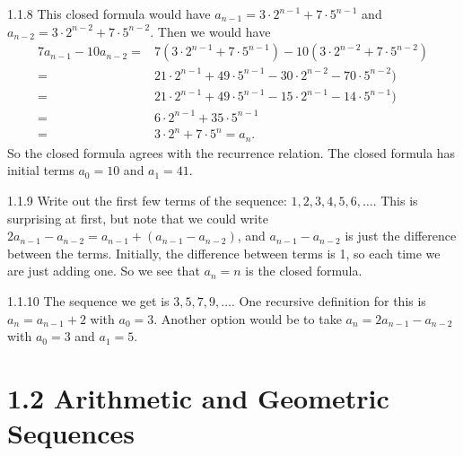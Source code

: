 \documentclass[11pt,]{book}
\theoremstyle{ptxplainnotitle}
\theoremstyle{ptxplaintitle}
\theoremstyle{ptxdefinitionnotitle}
\theoremstyle{ptxdefinitiontitle}
\theoremstyle{ptxdefinitionnotitle}
\theoremstyle{ptxdefinitiontitle}
\theoremstyle{ptxdefinitionnotitle}
\theoremstyle{ptxdefinitiontitle}
\theoremstyle{ptxdefinitiontitlenonumber}
\theoremstyle{ptxdefinitiontitlenonumber}
\numberwithin{equation}{chapter}
\newcommand{\amp}{&}
\begin{document}
\begin{divisionexercise}{1.1.8}
\textbf{}\hypertarget{p-141}{}%
This closed formula would have \(a_{n-1} = 3\cdot 2^{n-1} + 7 \cdot 5^{n-1}\) and \(a_{n-2} = 3\cdot 2^{n-2} + 7 \cdot 5^{n-2}\).  Then we would have%
\begin{align*}
7a_{n-1} - 10a_{n-2} = \amp 7(3\cdot 2^{n-1} + 7 \cdot 5^{n-1}) - 10(3\cdot 2^{n-2} + 7 \cdot 5^{n-2})\\
= \amp 21\cdot 2^{n-1} + 49 \cdot 5^{n-1} - 30\cdot 2^{n-2} - 70 \cdot 5^{n-2}) \\
= \amp 21\cdot 2^{n-1} + 49 \cdot 5^{n-1} - 15\cdot 2^{n-1} - 14 \cdot 5^{n-1}) \\
= \amp 6\cdot 2^{n-1} + 35 \cdot 5^{n-1} \\
= \amp 3\cdot 2^{n} + 7 \cdot 5^{n} = a_n. 
\end{align*}
So the closed formula agrees with the recurrence relation.  The closed formula has initial terms \(a_0 = 10\) and \(a_1 = 41\).%
\end{divisionexercise}%
\begin{divisionexercise}{1.1.9}
\textbf{}\hypertarget{p-143}{}%
Write out the first few terms of the sequence: \(1, 2, 3, 4, 5, 6,\ldots\). This is surprising at first, but note that we could write \(2a_{n-1} - a_{n-2} = a_{n-1} + (a_{n-1} -a_{n-2})\), and \(a_{n-1} - a_{n-2}\) is just the difference between the terms. Initially, the difference between terms is 1, so each time we are just adding one. So we see that \(a_n = n\) is the closed formula.%
\end{divisionexercise}%
\begin{divisionexercise}{1.1.10}
\textbf{}\hypertarget{p-145}{}%
The sequence we get is \(3, 5, 7, 9, \ldots\). One recursive definition for this is \(a_n = a_{n-1} + 2\) with \(a_0 = 3\). Another option would be to take \(a_n = 2a_{n-1} - a_{n-2}\) with \(a_0 = 3\) and \(a_1 = 5\).%
\end{divisionexercise}%
\section*{1.2 Arithmetic and Geometric Sequences}
\end{document}
